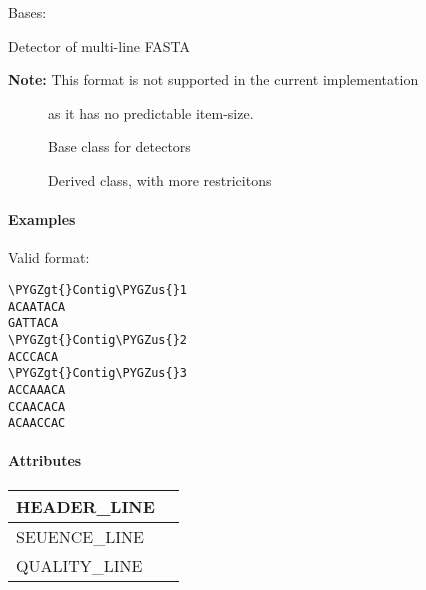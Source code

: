 \documentclass[letterpaper,10pt,english]{sphinxmanual}
\def\PYGZus{\char`\_}
\def\PYGZgt{\char`\>}
\begin{document}
\begin{fulllineitems}
\label{fseq.reading:fseq.reading.seq_encoder.FastaMultiline}
Bases: {\hyperref[fseq.reading:fseq.reading.seq_encoder.SeqFormat]{}}

Detector of multi-line FASTA
\begin{description}
\item[{\textbf{Note:} This format is not supported in the current implementation}] \leavevmode
as it has no predictable item-size.

\end{description}



\begin{description}
\item[{{\hyperref[fseq.reading:fseq.reading.seq_encoder.SeqFormat]{}}}] \leavevmode
Base class for detectors

\item[{{\hyperref[fseq.reading:fseq.reading.seq_encoder.FastaSingleline]{}}}] \leavevmode
Derived class, with more restricitons

\end{description}


\paragraph{Examples}

Valid format:

\begin{Verbatim}[commandchars=\\\{\}]
\PYGZgt{}Contig\PYGZus{}1
ACAATACA
GATTACA
\PYGZgt{}Contig\PYGZus{}2
ACCCACA
\PYGZgt{}Contig\PYGZus{}3
ACCAAACA
CCAACACA
ACAACCAC
\end{Verbatim}
\paragraph{Attributes}

\begin{tabulary}{\linewidth}{|L|L|}
\hline

HEADER\_LINE
 & \\
\hline
SEUENCE\_LINE
 & \\
\hline
QUALITY\_LINE
 & \\
\hline\end{tabulary}


\end{fulllineitems}
\end{document}
